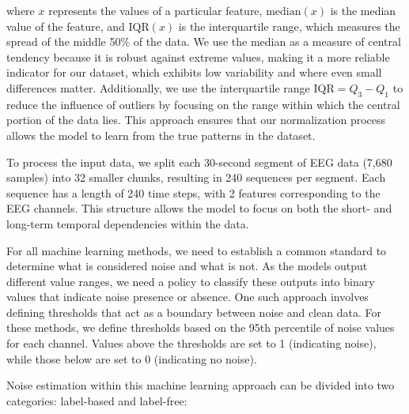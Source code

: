 where $x$ represents the values of a particular feature, $\text{median}(x)$ is the median value of the feature, and $\text{IQR}(x)$ is the interquartile range, which measures the spread of the middle 50\% of the data. We use the median as a measure of central tendency because it is robust against extreme values, making it a more reliable indicator for our dataset, which exhibits low variability and where even small differences matter. Additionally, we use the interquartile range $\text{IQR} = Q_3 - Q_1$ to reduce the influence of outliers by focusing on the range within which the central portion of the data lies. This approach ensures that our normalization process allows the model to learn from the true patterns in the dataset.

To process the input data, we split each 30-second segment of EEG data (7,680 samples) into 32 smaller chunks, resulting in 240 sequences per segment. Each sequence has a length of 240 time steps, with 2 features corresponding to the EEG channels. This structure allows the model to focus on both the short- and long-term temporal dependencies within the data.

For all machine learning methods, we need to establish a common standard to determine what is considered noise and what is not. As the models output different value ranges, we need a policy to classify these outputs into binary values that indicate noise presence or absence. One such approach involves defining thresholds that act as a boundary between noise and clean data. For these methods, we define thresholds based on the 95th percentile of noise values for each channel. Values above the thresholds are set to 1 (indicating noise), while those below are set to 0 (indicating no noise).

Noise estimation within this machine learning approach can be divided into two categories: label-based and label-free:

